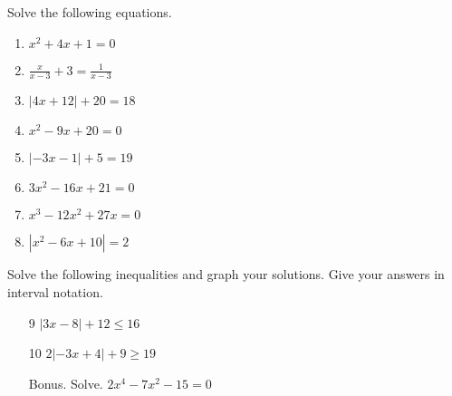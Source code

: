 \documentclass{article}
\begin{document}
\TestTitle[class={College Algebra}, name={Test 1}, term={Spring}, date={Sept. 11}, year={2015}, form={A}]

\AlgebraFacts

Solve the following equations.

\begin{enumerate}
\item 

$x^2 + 4x + 1 = 0$

   \vspace{4cm}

\item $\displaystyle\frac{x}{x - 3} + 3 = \displaystyle\frac{1}{x - 3}$ \vspace{4cm}

\item $|4x + 12| + 20 = 18$ \vspace{4cm}

\item $x^2 - 9x + 20 = 0$

   \vspace{4cm}

\newpage

\item $|-3x - 1| + 5 = 19$ \vspace{5cm}

\item $3x^2 - 16x + 21 = 0$

   \vspace{5cm}

\item $x^3 - 12x^2 + 27x = 0$

   \vspace{5cm}

\item $|x^2 - 6x + 10| = 2$

   \vspace{5cm}
\end{enumerate}

\newpage

Solve the following inequalities and graph your solutions. Give your answers in interval notation.

\begin{enumerate}
\item[9] $|3x - 8| + 12 \leq 16$ \vspace{5cm}

\item[10] $2|-3x + 4| + 9 \geq 19$ \vspace{5cm}

\item[Bonus.] Solve. $2x^4 - 7x^2 - 15 = 0$

   \vspace{4cm}
\end{enumerate}
\end{document}
